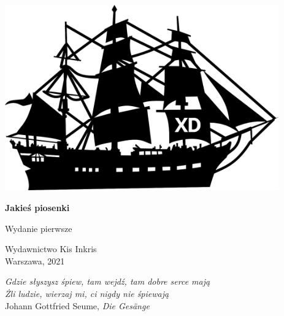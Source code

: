 \documentclass[11pt, twoside]{book}
\begin{document}
\begin{titlepage}
    \begin{center}
        \vspace*{5cm}
        
        \includegraphics[height=8cm]{images/front-obrazek.png}

        \vspace{1.5cm}

        \Huge\textbf{Jakieś piosenki}
        
        \vspace{0.5cm}
        
        \large Wydanie pierwsze
        
        \vfill

        \large
        Wydawnictwo Kis Inkris \\
        Warszawa, 2021

        \vspace{0.8cm}

        \footnotesize
        \textit{%
        Gdzie słyszysz śpiew, tam wejdź, tam dobre serce mają \\
        Żli ludzie, wierzaj mi, ci nigdy nie śpiewają} \medskip \\
        Johann Gottfried Seume, \textit{Die Gesänge}

    \end{center}
\end{titlepage}

\pagestyle{plain}
\end{document}
